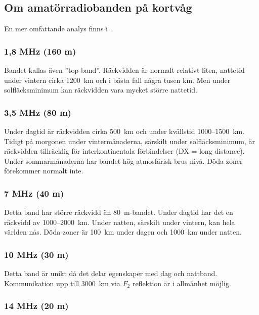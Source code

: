 \subsection{Om amatörradiobanden på kortvåg}

En mer omfattande analys finns i \cite{ARRLHDB2015}.

\subsubsection{1,8 MHz (160 m)}

Bandet kallas även ''top-band''.
Räckvidden är normalt relativt liten, nattetid under vintern cirka 1200~km och i
bästa fall några tusen km.
Men under solfläcksminimum kan räckvidden vara mycket större nattetid.

\subsubsection{3,5 MHz (80 m)}

Under dagtid är räckvidden cirka 500~km och under kvällstid 1000--1500~km.
Tidigt på morgonen under vintermånaderna, särskilt under solfläcksminimum, är
räckvidden tillräcklig för interkontinentala förbindelser (DX = long distance).
Under sommarmånaderna har bandet hög atmosfärisk brus nivå.
Döda zoner förekommer normalt inte.

\subsubsection{7 MHz (40 m)}

Detta band har större räckvidd än 80~m-bandet.
Under dagtid har det en räckvidd av 1000--2000~km.
Under natten, särskilt under vintern, kan hela världen nås.
Döda zoner är 100~km under dagen och 1000~km under natten.

\subsubsection{10 MHz (30 m)}

Detta band är unikt då det delar egenskaper med dag och nattband.
Kommunikation upp till 3000~km via \(F_2\) reflektion är i allmänhet möjlig.

\subsubsection{14 MHz (20 m)}

